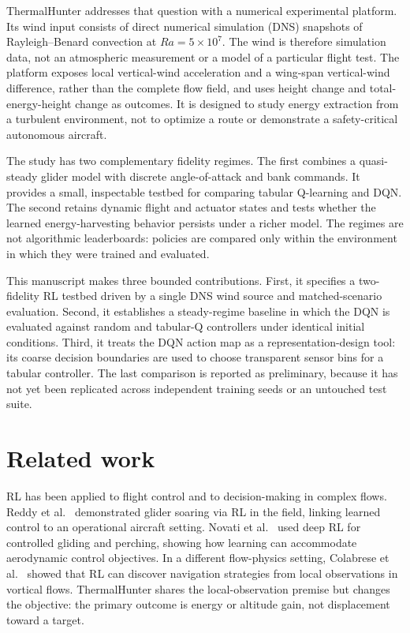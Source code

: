 \documentclass{article}
\begin{document}
ThermalHunter addresses that question with a numerical experimental platform.
Its wind input consists of direct numerical simulation (DNS) snapshots of
Rayleigh--Benard convection at $Ra=5\times10^{7}$.  The wind is therefore
simulation data, not an atmospheric measurement or a model of a particular
flight test.  The platform exposes local vertical-wind acceleration and a
wing-span vertical-wind difference, rather than the complete flow field, and
uses height change and total-energy-height change as outcomes.  It is designed
to study energy extraction from a turbulent environment, not to optimize a
route or demonstrate a safety-critical autonomous aircraft.

The study has two complementary fidelity regimes.  The first combines a
quasi-steady glider model with discrete angle-of-attack and bank commands.  It
provides a small, inspectable testbed for comparing tabular Q-learning and DQN.
The second retains dynamic flight and actuator states and tests whether the
learned energy-harvesting behavior persists under a richer model.
The regimes are not algorithmic leaderboards: policies are compared only within
the environment in which they were trained and evaluated.

This manuscript makes three bounded contributions.  First, it specifies a
two-fidelity RL testbed driven by a single DNS wind source and matched-scenario
evaluation.  Second, it establishes a steady-regime baseline in which the DQN
is evaluated against random and tabular-Q controllers under identical initial
conditions.  Third, it treats the DQN action map as a representation-design
tool: its coarse decision boundaries are used to choose transparent sensor bins
for a tabular controller.  The last comparison is reported as preliminary,
because it has not yet been replicated across independent training seeds or an
untouched test suite.

\section{Related work}

RL has been applied to flight control and to decision-making in complex flows.
Reddy et al.\ \citep{reddy2018} demonstrated glider soaring via RL in the
field, linking learned control to an operational aircraft setting.  Novati et
al.\ \citep{novati2019} used deep RL for controlled gliding and perching,
showing how learning can accommodate aerodynamic control objectives.  In a
different flow-physics setting, Colabrese et al.\ \citep{colabrese2017}
showed that RL can discover navigation strategies from local observations in
vortical flows.  ThermalHunter shares the local-observation premise but changes
the objective: the primary outcome is energy or altitude gain, not displacement
toward a target.
\end{document}
